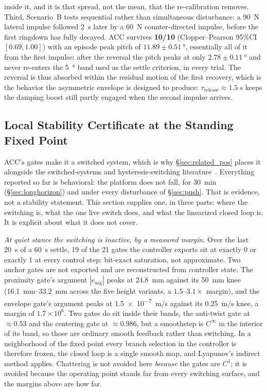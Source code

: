 \documentclass[conference]{IEEEtran}
\begin{document}
inside it, and it is that spread, not the mean, that the re-calibration removes.
Third, Scenario~B tests sequential rather than simultaneous disturbance: a
\SI{90}{N} lateral impulse followed \SI{2}{s} later by a \SI{60}{N} counter-directed
impulse, before the first ringdown has fully decayed. ACC survives
\textbf{10/10} (Clopper--Pearson 95\%CI $[0.69,1.00]$) with an episode peak
pitch of $11.89\pm\SI{0.51}{\degree}$, essentially all of it from the first
impulse: after the reversal the pitch peaks at only
$2.78\pm\SI{0.11}{\degree}$ and never re-enters the \SI{5}{\degree} band used as
the settle criterion, in every trial. The reversal is thus absorbed within the
residual motion of the first recovery, which is the behavior the asymmetric
envelope is designed to produce: $\tau_{\text{release}}{\approx}\SI{1.5}{s}$
keeps the damping boost still partly engaged when the second impulse arrives.


\subsection{Local Stability Certificate at the Standing Fixed Point}
\label{sec:stability}

ACC's gates make it a switched system, which is why \S\ref{sec:related_pos} places it alongside the switched-systems and hysteresis-switching literature~\cite{liberzon2003switching,hespanha2003hysteresis}. Everything reported so far is behavioral: the platform does not fall, for \SI{30}{min} (\S\ref{sec:longhorizon}) and under every disturbance of \S\ref{sec:push}. That is evidence, not a stability statement. This section supplies one, in three parts: where the switching is, what the one live switch does, and what the linearized closed loop is. It is explicit about what it does not cover.

\emph{At quiet stance the switching is inactive, by a measured margin.} Over the last \SI{20}{s} of a \SI{60}{s} settle, \num{19} of the \num{21} gates the controller exports sit at exactly \num{0} or exactly \num{1} at every control step: bit-exact saturation, not approximate. Two anchor gates are not exported and are reconstructed from controller state. The proximity gate's argument $|e_{\text{sag}}|$ peaks at \SI{24.8}{mm} against its \SI{50}{mm} knee (\SIrange{16.1}{33.2}{mm} across the five height variants, a $1.5$--$3.1{\times}$ margin), and the envelope gate's argument peaks at \SI{1.5e-7}{m/s} against its \SI{0.25}{m/s} knee, a margin of $1.7{\times}10^{6}$. Two gates do sit inside their bands, the anti-twist gate at ${\approx}\num{0.53}$ and the centering gate at ${\approx}\num{0.986}$, but a smoothstep is $C^\infty$ in the interior of its band, so those are ordinary smooth feedback rather than switching. In a neighborhood of the fixed point every branch selection in the controller is therefore frozen, the closed loop is a single smooth map, and Lyapunov's indirect method applies. Chattering is not avoided here \emph{because} the gates are $C^1$; it is avoided because the operating point stands far from every switching surface, and the margins above are how far.
\end{document}
